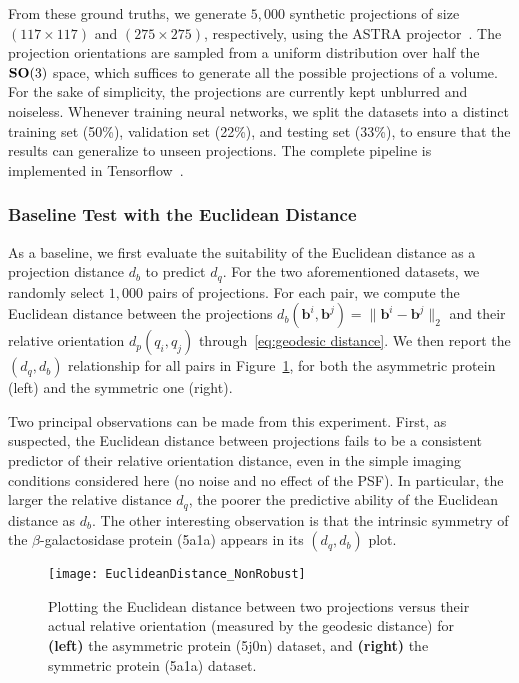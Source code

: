 From these ground truths, we generate $5,000$ synthetic projections of size $(117\times 117)$ and $(275\times 275)$, respectively, using the ASTRA projector~\cite{van2015astra}. The projection orientations are sampled from a uniform distribution over half the $\mathrm{\mathbf{SO}}(3)$ space, which suffices to generate all the possible projections of a volume. For the sake of simplicity, the projections are currently kept unblurred and noiseless. Whenever training neural networks, we split the datasets into a distinct training set (50\%), validation set (22\%), and testing set (33\%), to ensure that the results can generalize to unseen projections. The complete pipeline is implemented in Tensorflow~\cite{abadi2016tensorflow}.

\subsubsection{Baseline Test with the Euclidean Distance}

As a baseline, we first evaluate the suitability of the Euclidean distance as a projection distance $d_b$ to predict $d_q$. For the two aforementioned datasets, we randomly select $1,000$ pairs of projections. For each pair, we compute the Euclidean distance between the projections $d_b(\mathbf{b}^i,\mathbf{b}^j)=\lVert\mathbf{b}^i-\mathbf{b}^j\rVert_2$ and their relative orientation $d_p(q_i,q_j)$ through~\eqref{eq:geodesic distance}. We then report the $(d_q,d_b)$ relationship for all pairs in Figure~\ref{fig:euclidean-not-robust}, for both the asymmetric protein (left) and the symmetric one (right).

Two principal observations can be made from this experiment. First, as suspected, the Euclidean distance between projections fails to be a consistent predictor of their relative orientation distance, even in the simple imaging conditions considered here (no noise and no effect of the PSF). In particular, the larger the relative distance $d_q$, the poorer the predictive ability of the Euclidean distance as $d_b$. The other interesting observation is that the intrinsic symmetry of the $\beta$-galactosidase protein (5a1a) appears in its $(d_q,d_b)$ plot.

\begin{figure}
    \centering
    \texttt{[image: EuclideanDistance\_NonRobust]}
    \caption{Plotting the Euclidean distance between two projections versus their actual relative orientation (measured by the geodesic distance) for \textbf{(left)} the asymmetric protein (5j0n) dataset, and \textbf{(right)} the symmetric protein (5a1a) dataset. }
    \label{fig:euclidean-not-robust}
\end{figure}

